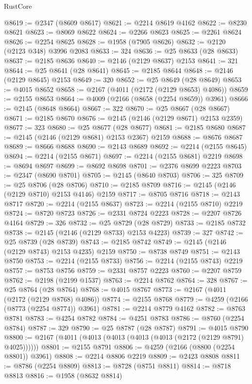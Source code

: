 \begin{lexlean}{RustCore}
\begin{coremodule}
@8619 := @2347 (@8609 @8617)
@8621 := @2214 @8619 @4162
@8622 := @8230 @8621
@8623 := @8069 @8622
@8624 := @2266 @8623
@8625 := @2261 @8624
@8626 := @2254 @8625
@8628 := @1958 (@7905 @8626)
@8632 := @2120 (@2123 @348) @3996 @2083
@8633 := 324
@8636 := @25 @8633 (@28 @8633)
@8637 := @2185 @8636
@8640 := @2146 (@2129 @8637) @2153
@8641 := 321
@8644 := @25 @8641 (@28 @8641)
@8645 := @2185 @8644
@8648 := @2146 (@2129 @8645) @2153
@8649 := 320
@8652 := @25 @8649 (@28 @8649)
@8653 := @4015 @8652
@8658 := @2167 (@4011 (@2172 (@2129 @8653) @4086))
@8659 := @2155 @8653
@8664 := @4009 (@2166 (@8658 (@2254 @8659)) @3961)
@8666 := @2145 (@8648 @8664)
@8667 := 322
@8670 := @25 @8667 (@28 @8667)
@8671 := @2185 @8670
@8676 := @2145 (@2146 (@2129 @8671) @2153 @2359)
@8677 := 323
@8680 := @25 @8677 (@28 @8677)
@8681 := @2185 @8680
@8687 := @2145 (@2146 (@2129 @8681) @2153 @2367) @2159
@8688 := @8676 @8687
@8689 := @8666 @8688
@8690 := @2143 @8689
@8692 := @2214 (@2155 @8645)
@8694 := @2214 (@2155 @8671)
@8697 := @2214 (@2155 @8681) @2219
@8698 := @8694 @8697
@8699 := @8692 @8698
@8701 := @2376 @8699 @2223
@8703 := @2347 (@8690 @8701)
@8705 := @2145 (@8640 @8703)
@8706 := 325
@8709 := @25 @8706 (@28 @8706)
@8710 := @2185 @8709
@8716 := @2145 (@2146 (@2129 @8710) @2153 @4146) @2159
@8717 := @8705 @8716
@8718 := @2143 @8717
@8720 := @2214 (@2155 @8637)
@8723 := @2214 (@2155 @8710) @2219
@8724 := @8720 @8723
@8726 := @2331 @8724 @2223
@8728 := @2207 @8726 @4164
@8729 := 326
@8732 := @25 @8729 (@28 @8729)
@8733 := @2185 @8732
@8738 := @2145 (@2146 (@2129 @8733) @2153 @4223)
@8739 := 327
@8742 := @25 @8739 (@28 @8739)
@8743 := @2185 @8742
@8749 := @2145 (@2146 (@2129 @8743) @2153 @4235) @2159
@8750 := @8738 @8749
@8751 := @2143 @8750
@8753 := @2214 (@2155 @8733)
@8756 := @2214 (@2155 @8743) @2219
@8757 := @8753 @8756
@8759 := @2331 @8757 @2223
@8760 := @2207 @8759
@8762 := @2198 (@2199 @1537)
@8763 := @2214 @8762
@8764 := 328
@8767 := @25 @8764 (@28 @8764)
@8768 := @4015 @8767
@8773 := @2167 (@4011 (@2172 (@2129 @8768) @4086))
@8774 := @2155 @8768
@8779 := @4259 (@2166 (@8773 (@2254 @8774)) @3961)
@8781 := @2214 @8779 @4162
@8782 := @8763 @8781
@8783 := @4254 @8782
@8784 := @4251 @8783
@8786 := @8760 (@2254 @8784)
@8787 := 329
@8790 := @25 @8787 (@28 @8787)
@8791 := @4015 @8790
@8800 := @2167 (@4011 (@4013 (@4013 (@4013 (@4013 (@2172 (@2129 @8791) @4025))))))
@8801 := @2155 @8791
@8806 := @4259 (@2166 (@8800 (@2254 @8801)) @3961)
@8808 := @2214 @8806 @2219
@8809 := @2423 @8808
@8811 := @8786 (@2254 @8809)
@8813 := @8728 (@8751 @8811)
@8814 := @8718 @8813
@8816 := @1958 (@8632 @8814)

\end{coremodule}
\end{lexlean}
